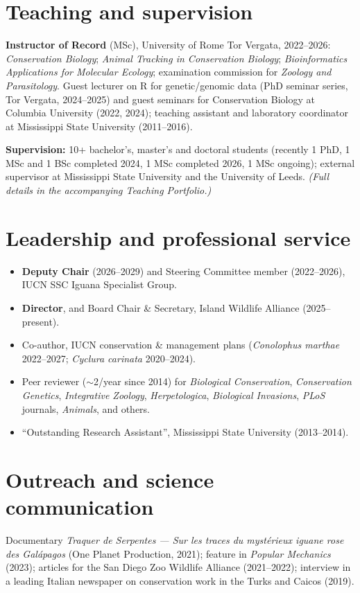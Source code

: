 \documentclass[11pt]{article}
\begin{document}
\section*{Teaching and supervision}
\noindent\textbf{Instructor of Record} (MSc), University of Rome Tor Vergata, 2022--2026: \emph{Conservation Biology}; \emph{Animal Tracking in Conservation Biology}; \emph{Bioinformatics Applications for Molecular Ecology}; examination commission for \emph{Zoology and Parasitology}. Guest lecturer on R for genetic/genomic data (PhD seminar series, Tor Vergata, 2024--2025) and guest seminars for Conservation Biology at Columbia University (2022, 2024); teaching assistant and laboratory coordinator at Mississippi State University (2011--2016).\par
\vspace{0.3em}
\noindent\textbf{Supervision:} 10+ bachelor's, master's and doctoral students (recently 1 PhD, 1 MSc and 1 BSc completed 2024, 1 MSc completed 2026, 1 MSc ongoing); external supervisor at Mississippi State University and the University of Leeds. \emph{(Full details in the accompanying Teaching Portfolio.)}

\section*{Leadership and professional service}
\begin{itemize}[leftmargin=1.4em,itemsep=2pt]
\item \textbf{Deputy Chair} (2026--2029) and Steering Committee member (2022--2026), IUCN SSC Iguana Specialist Group.
\item \textbf{Director}, and Board Chair \& Secretary, Island Wildlife Alliance (2025--present).
\item Co-author, IUCN conservation \& management plans (\emph{Conolophus marthae} 2022--2027; \emph{Cyclura carinata} 2020--2024).
\item Peer reviewer ($\sim$2/year since 2014) for \emph{Biological Conservation}, \emph{Conservation Genetics}, \emph{Integrative Zoology}, \emph{Herpetologica}, \emph{Biological Invasions}, \emph{PLoS} journals, \emph{Animals}, and others.
\item ``Outstanding Research Assistant'', Mississippi State University (2013--2014).
\end{itemize}

\section*{Outreach and science communication}
Documentary \emph{Traquer de Serpentes --- Sur les traces du myst\'erieux iguane rose des Gal\'apagos} (One Planet Production, 2021); feature in \emph{Popular Mechanics} (2023); articles for the San Diego Zoo Wildlife Alliance (2021--2022); interview in a leading Italian newspaper on conservation work in the Turks and Caicos (2019).
\end{document}
